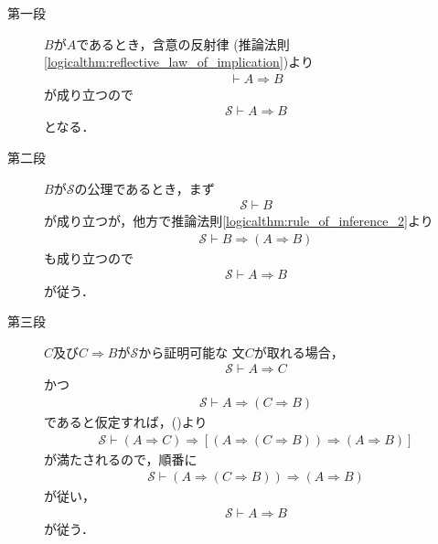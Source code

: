 	\begin{metaprf}\mbox{}
		\begin{description}
			\item[第一段]
				$B$が$A$であるとき，含意の反射律
				(推論法則\ref{logicalthm:reflective_law_of_implication})より
				\begin{align}
					\vdash A \Longrightarrow B
				\end{align}
				が成り立つので
				\begin{align}
					\mathscr{S} \vdash A \Longrightarrow B
				\end{align}
				となる．
				
			\item[第二段]
				$B$が$\mathscr{S}$の公理であるとき，まず
				\begin{align}
					\mathscr{S} \vdash B
				\end{align}
				が成り立つが，他方で推論法則\ref{logicalthm:rule_of_inference_2}より
				\begin{align}
					\mathscr{S} \vdash B \Longrightarrow (A \Longrightarrow B) 
				\end{align}
				も成り立つので
				\begin{align}
					\mathscr{S} \vdash A \Longrightarrow B
				\end{align}
				が従う．
				
			\item[第三段]
				$C$及び$C \Longrightarrow B$が$\mathscr{S}$から証明可能な
				文$C$が取れる場合，
				\begin{align}
					\mathscr{S} \vdash A \Longrightarrow C
				\end{align}
				かつ
				\begin{align}
					\mathscr{S} \vdash A \Longrightarrow (C \Longrightarrow B)
				\end{align}
				であると仮定すれば，()より
				\begin{align}
					\mathscr{S} \vdash 
					(A \Longrightarrow C) \Longrightarrow [(A \Longrightarrow (
					C \Longrightarrow B)) \Longrightarrow (A \Longrightarrow B)]
				\end{align}
				が満たされるので，順番に
				\begin{align}
					\mathscr{S} \vdash (A \Longrightarrow (
					C \Longrightarrow B)) \Longrightarrow (A \Longrightarrow B)
				\end{align}
				が従い，
				\begin{align}
					\mathscr{S} \vdash A \Longrightarrow B
				\end{align}
				が従う．
				\QED
		\end{description}
	\end{metaprf}
	
